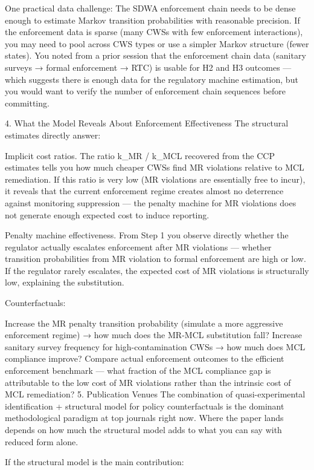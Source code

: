 One practical data challenge: The SDWA enforcement chain needs to be dense enough to estimate Markov transition probabilities with reasonable precision. If the enforcement data is sparse (many CWSs with few enforcement interactions), you may need to pool across CWS types or use a simpler Markov structure (fewer states). You noted from a prior session that the enforcement chain data (sanitary surveys → formal enforcement → RTC) is usable for H2 and H3 outcomes — which suggests there is enough data for the regulatory machine estimation, but you would want to verify the number of enforcement chain sequences before committing.

4. What the Model Reveals About Enforcement Effectiveness
The structural estimates directly answer:

Implicit cost ratios. The ratio k_MR / k_MCL recovered from the CCP estimates tells you how much cheaper CWSs find MR violations relative to MCL remediation. If this ratio is very low (MR violations are essentially free to incur), it reveals that the current enforcement regime creates almost no deterrence against monitoring suppression — the penalty machine for MR violations does not generate enough expected cost to induce reporting.

Penalty machine effectiveness. From Step 1 you observe directly whether the regulator actually escalates enforcement after MR violations — whether transition probabilities from MR violation to formal enforcement are high or low. If the regulator rarely escalates, the expected cost of MR violations is structurally low, explaining the substitution.

Counterfactuals:

Increase the MR penalty transition probability (simulate a more aggressive enforcement regime) → how much does the MR-MCL substitution fall?
Increase sanitary survey frequency for high-contamination CWSs → how much does MCL compliance improve?
Compare actual enforcement outcomes to the efficient enforcement benchmark — what fraction of the MCL compliance gap is attributable to the low cost of MR violations rather than the intrinsic cost of MCL remediation?
5. Publication Venues
The combination of quasi-experimental identification + structural model for policy counterfactuals is the dominant methodological paradigm at top journals right now. Where the paper lands depends on how much the structural model adds to what you can say with reduced form alone.

If the structural model is the main contribution:

